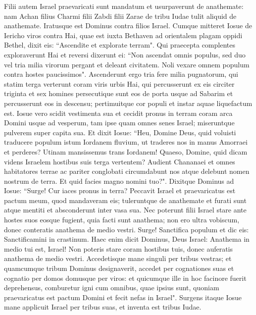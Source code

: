 \begin{biblechapter}  
\verse Filii autem Israel praevaricati sunt mandatum et usurpaverunt de anathemate: nam Achan filius Charmi filii Zabdi filii Zarae de tribu Iudae tulit aliquid de anathemate. Iratusque est Dominus contra filios Israel. 
\verse Cumque mitteret Iosue de Iericho viros contra Hai, quae est iuxta Bethaven ad orientalem plagam oppidi Bethel, dixit eis: “Ascendite et explorate terram". Qui praecepta complentes exploraverunt Hai 
\verse et reversi dixerunt ei: “Non ascendat omnis populus, sed duo vel tria milia virorum pergant et deleant civitatem. Noli vexare omnem populum contra hostes paucissimos". 
\verse Ascenderunt ergo tria fere milia pugnatorum, qui statim terga verterunt coram viris urbis Hai, 
\verse qui percusserunt ex eis circiter triginta et sex homines persecutique sunt eos de porta usque ad Sabarim et percusserunt eos in descensu; pertimuitque cor populi et instar aquae liquefactum est. 
\verse Iosue vero scidit vestimenta sua et cecidit pronus in terram coram arca Domini usque ad vesperum, tam ipse quam omnes senes Israel; miseruntque pulverem super capita sua. 
\verse Et dixit Iosue: “Heu, Domine Deus, quid voluisti traducere populum istum Iordanem fluvium, ut traderes nos in manus Amorraei et perderes? Utinam mansissemus trans Iordanem! 
\verse Quaeso, Domine, quid dicam videns Israelem hostibus suis terga vertentem? 
\verse Audient Chananaei et omnes habitatores terrae ac pariter conglobati circumdabunt nos atque delebunt nomen nostrum de terra. Et quid facies magno nomini tuo?". 
\verse Dixitque Dominus ad Iosue: “Surge! Cur iaces pronus in terra? 
\verse Peccavit Israel et praevaricatus est pactum meum, quod mandaveram eis; tuleruntque de anathemate et furati sunt atque mentiti et absconderunt inter vasa sua. 
\verse Nec poterunt filii Israel stare ante hostes suos eosque fugient, quia facti sunt anathema; non ero ultra vobiscum, donec conteratis anathema de medio vestri. 
\verse Surge! Sanctifica populum et dic eis: Sanctificamini in crastinum. Haec enim dicit Dominus, Deus Israel: Anathema in medio tui est, Israel! Non poteris stare coram hostibus tuis, donec auferatis anathema de medio vestri. 
\verse Accedetisque mane singuli per tribus vestras; et quamcumque tribum Dominus designaverit, accedet per cognationes suas et cognatio per domos domusque per viros: 
\verse et quicumque ille in hoc facinore fuerit deprehensus, comburetur igni cum omnibus, quae ipsius sunt, quoniam praevaricatus est pactum Domini et fecit nefas in Israel". 
\verse Surgens itaque Iosue mane applicuit Israel per tribus suas, et inventa est tribus Iudae. 

\end{biblechapter}
